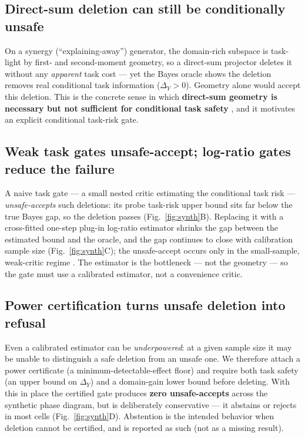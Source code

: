 \subsection{Direct-sum deletion can still be conditionally unsafe}
On a synergy (``explaining-away'') generator, the domain-rich subspace is task-light by first- and
second-moment geometry, so a direct-sum projector deletes it without any \emph{apparent} task cost --- yet the
Bayes oracle shows the deletion removes real conditional task information ($\Delta_Y > 0$). Geometry alone would
accept this deletion. This is the concrete sense in which \textbf{direct-sum geometry is necessary but not
sufficient for conditional task safety} , and it motivates an explicit conditional task-risk gate.

\subsection{Weak task gates unsafe-accept; log-ratio gates reduce the failure}
A naive task gate --- a small nested critic estimating the conditional task risk --- \emph{unsafe-accepts} such
deletions: its probe task-risk upper bound sits far below the true Bayes gap, so the deletion passes (Fig.~\ref{fig:synth}B). Replacing it with a cross-fitted one-step plug-in log-ratio estimator shrinks the gap between the
estimated bound and the oracle, and the gap continues to close with calibration sample size (Fig.~\ref{fig:synth}C); the
unsafe-accept occurs only in the small-sample, weak-critic regime . The estimator is the bottleneck ---
not the geometry --- so the gate must use a calibrated estimator, not a convenience critic.

\subsection{Power certification turns unsafe deletion into refusal}
Even a calibrated estimator can be \emph{underpowered}: at a given sample size it may be unable to distinguish a
safe deletion from an unsafe one. We therefore attach a power certificate (a minimum-detectable-effect
floor) and require both task safety (an upper bound on $\Delta_Y$) and a domain-gain lower bound before deleting.
With this in place the certified gate produces \textbf{zero unsafe-accepts} across the synthetic phase diagram,
but is deliberately conservative --- it abstains or rejects in most cells (Fig.~\ref{fig:synth}D). Abstention is the intended
behavior when deletion cannot be certified, and is reported as such (not as a missing result).

